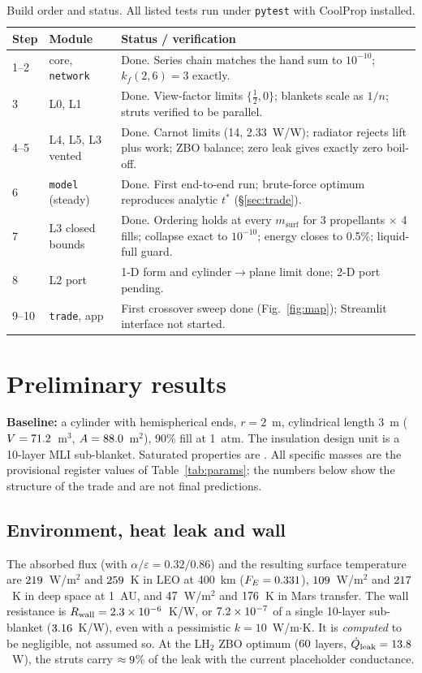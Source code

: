 \documentclass[11pt]{article}
\newcommand{\Qd}{\dot Q}
\begin{document}
\begin{table}[!htb]
\centering\small
\caption{Build order and status. All listed tests run under \texttt{pytest} with CoolProp installed.}
\label{tab:status}
\begin{tabular}{@{}llp{9.4cm}@{}}
\toprule
Step & Module & Status / verification\\
\midrule
1--2 & core, \texttt{network} & Done. Series chain matches the hand sum to $10^{-10}$; $k_f(2,6)=3$ exactly.\\
3 & L0, L1 & Done. View-factor limits $\{\tfrac12,0\}$; blankets scale as $1/n$; struts verified to be parallel.\\
4--5 & L4, L5, L3 vented & Done. Carnot limits (14, 2.33~W/W); radiator rejects lift plus work; ZBO balance; zero leak gives exactly zero boil-off.\\
6 & \texttt{model} (steady) & Done. First end-to-end run; brute-force optimum reproduces analytic $t^*$ (\S\ref{sec:trade}).\\
7 & L3 closed bounds & Done. Ordering holds at every $m_\text{surf}$ for 3 propellants $\times$ 4 fills; collapse exact to $10^{-10}$; energy closes to 0.5\%; liquid-full guard.\\
8 & L2 port & 1-D form and cylinder$\to$plane limit done; 2-D port pending.\\
9--10 & \texttt{trade}, app & First crossover sweep done (Fig.~\ref{fig:map}); Streamlit interface not started.\\
\bottomrule
\end{tabular}
\end{table}

\section{Preliminary results}
\textbf{Baseline:} a cylinder with hemispherical ends, $r=2$~m, cylindrical length $3$~m
($V=71.2$~m$^3$, $A=88.0$~m$^2$), 90\% fill at 1~atm. The insulation design unit is a 10-layer MLI
sub-blanket. Saturated properties are \PropSource. All specific masses are the provisional register values of
Table~\ref{tab:params}; the numbers below show the structure of the trade and are not final predictions.

\subsection{Environment, heat leak and wall}
The absorbed flux (with $\alpha/\varepsilon=0.32/0.86$) and the resulting surface temperature are
$219$~W/m$^2$ and $259$~K in LEO at 400~km ($F_E=0.331$), $109$~W/m$^2$ and $217$~K in deep space
at 1~AU, and $47$~W/m$^2$ and $176$~K in Mars transfer. The wall resistance is
$R_\text{wall}=2.3\times10^{-6}$~K/W, or $7.2\times10^{-7}$ of a single 10-layer sub-blanket ($3.16$~K/W), even with a
pessimistic $k=10$~W/m$\cdot$K. It is \emph{computed} to be negligible, not assumed so. At the LH$_2$ ZBO
optimum ($60$ layers, $\Qd_\text{leak}=\QzH$~W), the struts carry $\approx9$\% of the leak with the
current placeholder conductance.
\end{document}
